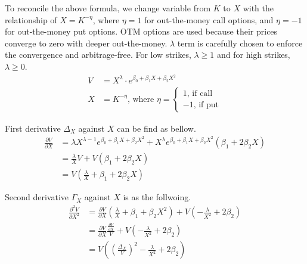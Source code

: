 \documentclass{article}
\begin{document}
To reconcile the above formula, we change variable from $ K $ to $ X $ with the relationship of $ X = K^{-\eta} $, where $ \eta = 1 $ for out-the-money call options, and $ \eta = -1 $ for out-the-money put options.
OTM options are used because their prices converge to zero with deeper out-the-money.
$ \lambda $ term is carefully chosen to enforce the convergence and arbitrage-free.
For low strikes, $ \lambda \geq 1 $ and for high strikes, $ \lambda \geq 0 $.
\begin{subequations}
    \begin{align}   
        V &= X^{\lambda} \cdot e^{\beta_0 + \beta_1 X + \beta_2 X^2} \\
        X &= K^{-\eta} \text{, where } \eta = 
        \begin{cases}
            1 \text{, if call} \\
            -1 \text{, if put}
        \end{cases}
    \end{align}
\end{subequations}

First derivative $ \Delta_X $ against $ X $ can be find as bellow.
\begin{align}
    \frac{\partial V}{\partial X} &= \lambda X^{\lambda - 1} e^{\beta_0 + \beta_1 X + \beta_2 X^2} + X^{\lambda} e^{\beta_0 + \beta_1 X + \beta_2 X^2} \left(\beta_1 + 2 \beta_2 X \right) \nonumber \\
    &= \frac{\lambda}{X} V + V \left(\beta_1 + 2 \beta_2 X\right) \nonumber \\
    &= V \left(\frac{\lambda}{X} + \beta_1 + 2 \beta_2 X\right)
\end{align}

Second derivative $ \Gamma_X $ against $ X $ is as the follwoing.
\begin{align}
    \frac{\partial^2 V}{\partial X^2} &= \frac{\partial V}{\partial X} \left(\frac{\lambda}{X} + \beta_1 + \beta_2 X^2\right) + V \left(-\frac{\lambda}{X^2} + 2 \beta_2\right) \nonumber \\
    &= \frac{\partial V}{\partial X} \frac{\frac{\partial V}{\partial X}}{V} + V \left(-\frac{\lambda}{X^2} + 2 \beta_2\right) \nonumber \\
    &= V \left(\left(\frac{\Delta_X}{V}\right)^2 -\frac{\lambda}{X^2} + 2 \beta_2 \right)
\end{align}
\end{document}
